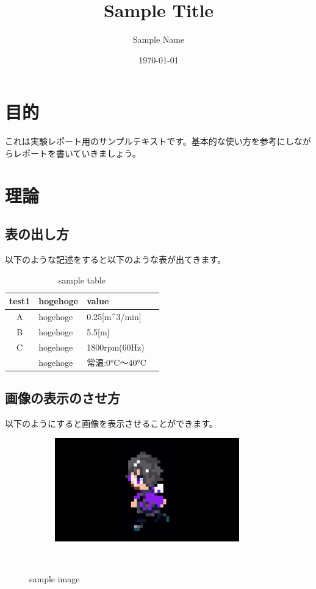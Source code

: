 \documentclass{jarticle}
\title{Sample Title}
\date{\today}
\author{Sample Name}
\begin{document}
 
\maketitle
\thispagestyle{empty} %
\newpage%

\setcounter{tocdepth}{2}
\tableofcontents
\newpage

\section{目的}
これは実験レポート用のサンプルテキストです。基本的な使い方を参考にしながらレポートを書いていきましょう。

\section{理論}
\subsection{表の出し方}
以下のような記述をすると以下のような表が出てきます。

\begin{table}[h]
 \caption{sample table}
 \label{table:SpeedOfLight}
 \centering
  \begin{tabular}{clll}
   \hline
   test1 & hogehoge & value  \\
   \hline \hline
   A & hogehoge & 0.25[m^3/min] \\
   B & hogehoge & 5.5[m]  \\
   C & hogehoge & 1800rpm(60Hz)  \\
      & hogehoge & 常温:0°C～40°C  \\
   \hline
  \end{tabular}
\end{table}

\subsection{画像の表示のさせ方}
以下のようにすると画像を表示させることができます。

\begin{figure}[h]%
    \centering
　　　\includegraphics[width=80mm]{img/sample.png}
　　　\caption{sample image}
　  \label{fig1}
\end{figure}
\end{document}
